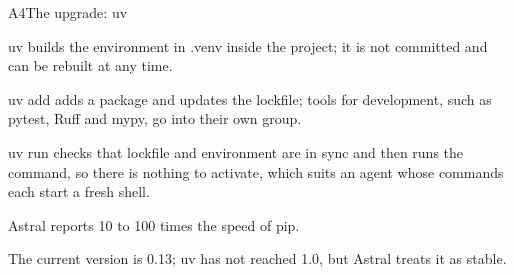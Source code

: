 \begin{frame}[fragile,source={Astral (2026), uv documentation: projects, running commands, lockfile; uv README and its speed benchmark}]{A4\enspace The upgrade: uv}
{    uv builds the environment in .venv inside the project; it is not committed and can be
      rebuilt at any time.\par
    uv add adds a package and updates the lockfile; tools for development, such as pytest, Ruff
      and mypy, go into their own group.\par
    uv run checks that lockfile and environment are in sync and then runs the command, so there
      is nothing to activate, which suits an agent whose commands each start a fresh shell.\par
    Astral reports 10 to 100 times the speed of pip.\par
    The current version is 0.13; uv has not reached 1.0, but Astral treats it as stable.}
\end{frame}

